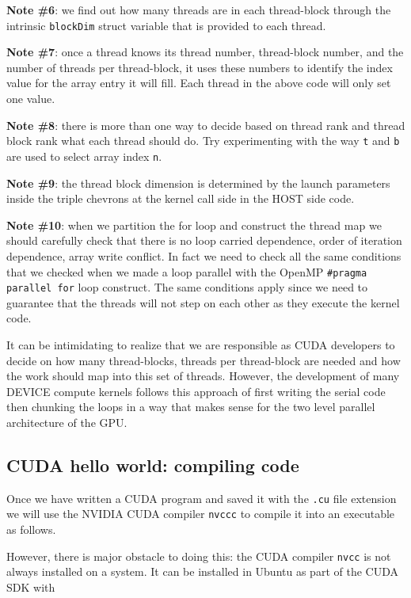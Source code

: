 {\bf Note \#6}: we find out how many threads are in each thread-block through the intrinsic \texttt{blockDim} struct variable that is provided to each thread. 

{\bf Note \#7}: once a thread knows its thread number, thread-block number, and the number of threads per thread-block, it uses these numbers to identify the index value for the array entry it will fill. Each thread in the above code will only set one value.

{\bf Note \#8}: there is more than one way to decide based on thread rank and thread block rank what each thread should do. Try experimenting with the way \texttt{t} and \texttt{b} are used to select array index \texttt{n}.

{\bf Note \#9}: the thread block dimension is determined by the launch parameters inside the triple chevrons at the kernel call side in the HOST side code.

{\bf Note \#10}: when we partition the for loop and construct the thread map we should carefully check that there is no loop carried dependence, order of iteration dependence, array write conflict. In fact we need to check all the same conditions that we checked when we made a loop parallel with the OpenMP \texttt{\#pragma parallel for} loop construct. The same conditions apply since we need to guarantee that the threads will not step on each other as they execute the kernel code.

It can be intimidating to realize that we are responsible as CUDA developers to decide on how many thread-blocks, threads per thread-block are needed and how the work should map into this set of threads. However, the development of many DEVICE compute kernels follows this approach of first writing the serial code then chunking the loops in a way that makes sense for the two level parallel architecture of the GPU. 

\subsection{CUDA hello world: compiling code}

Once we have written a CUDA program and saved it with the \texttt{.cu} file extension we will use the NVIDIA CUDA compiler \texttt{nvccc} to compile it into an executable as follows.


However, there is major obstacle to doing this: the CUDA compiler \texttt{nvcc} is not always installed on a system. It can be installed in Ubuntu as part of the CUDA SDK with

